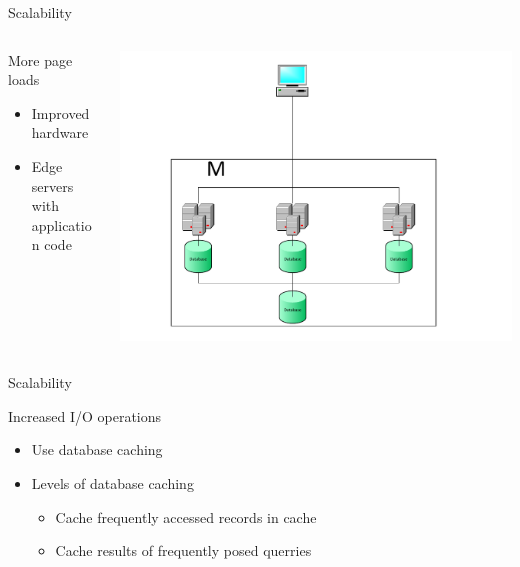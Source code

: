 \begin{frame}{Scalability}{}
  \begin{columns}[T]
    \begin{column}{.5\textwidth}
     \begin{block}{More page loads}
  		\begin{itemize}
  			\item Improved hardware
  			\item Edge servers with application code
  		\end{itemize}
			\end{block}
		\end{column}
    \begin{column}{.5\textwidth}
    \begin{block}{}
    \begin{center}
    \includegraphics[width=1\textwidth]{images/master_edge.pdf}
    \end{center}
    \end{block}
    \end{column}
    \end{columns}
\end{frame}

\begin{frame}{Scalability}{}
\begin{block}{Increased I/O operations}
  \begin{itemize}
    \item Use database caching
    \item Levels of database caching
    	\begin{itemize}
				\item Cache frequently accessed records in cache
				\item Cache results of frequently posed querries
			\end{itemize}
  \end{itemize}
\end{block}
\end{frame}

